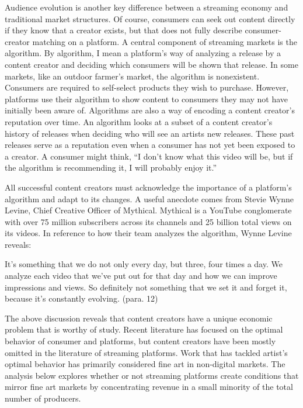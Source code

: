 \documentclass[
]{article}
\begin{document}
Audience evolution is another key difference between a streaming economy
and traditional market structures. Of course, consumers can seek out
content directly if they know that a creator exists, but that does not
fully describe consumer-creator matching on a platform. A central
component of streaming markets is the algorithm. By algorithm, I mean a
platform's way of analyzing a release by a content creator and deciding
which consumers will be shown that release. In some markets, like an
outdoor farmer's market, the algorithm is nonexistent. Consumers are
required to self-select products they wish to purchase. However,
platforms use their algorithm to show content to consumers they may not
have initially been aware of. Algorithms are also a way of encoding a
content creator's reputation over time. An algorithm looks at a subset
of a content creator's history of releases when deciding who will see an
artists new releases. These past releases serve as a reputation even
when a consumer has not yet been exposed to a creator. A consumer might
think, ``I don't know what this video will be, but if the algorithm is
recommending it, I will probably enjoy it.''

All successful content creators must acknowledge the importance of a
platform's algorithm and adapt to its changes. A useful anecdote comes
from Stevie Wynne Levine, Chief Creative Officer of Mythical. Mythical
is a YouTube conglomerate with over 75 million subscribers across its
channels and 25 billion total views on its videos. In reference to how
their team analyzes the algorithm, Wynne Levine reveals:

It's something that we do not only every day, but three, four times a
day. We analyze each video that we've put out for that day and how we
can improve impressions and views. So definitely not something that we
set it and forget it, because it's constantly evolving. (para. 12)

The above discussion reveals that content creators have a unique
economic problem that is worthy of study. Recent literature has focused
on the optimal behavior of consumer and platforms, but content creators
have been mostly omitted in the literature of streaming platforms. Work
that has tackled artist's optimal behavior has primarily considered fine
art in non-digital markets. The analysis below explores whether or not
streaming platforms create conditions that mirror fine art markets by
concentrating revenue in a small minority of the total number of
producers.
\end{document}
